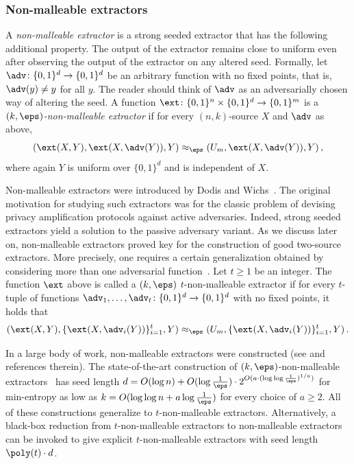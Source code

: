 \documentclass{toc}
\begin{document}
%
%
\subsubsection{Non-malleable extractors}
%
A \emph{non-malleable extractor} is a strong seeded extractor that has the following additional property. The output of the extractor remains close to uniform even after observing the output of the extractor on any altered seed. Formally, let $\adv \colon \{0,1\}^d \to \{0,1\}^d$ be an arbitrary function with no fixed points, that is, $\adv(y) \neq y$ for all $y$. The reader should think of $\adv$ as an adversarially chosen way of altering the seed. A function $\ext \colon \{0,1\}^n \times \{0,1\}^d \to \{0,1\}^m$ is a \emph{$(k,\eps)$-non-malleable extractor} if for every $(n,k)$-source $X$ and $\adv$ as above,
\begin{equation}\label{eq:nmext}
(\ext(X,Y),\ext(X,\adv(Y)),Y) \approx_\eps (U_m, \ext(X,\adv(Y)),Y)\,,
\end{equation}
where again $Y$ is uniform over $\{0,1\}^d$ and is independent of $X$. %



Non-malleable extractors were introduced by Dodis and Wichs~\cite{DW09}. The original motivation for studying such extractors %
was  %
for the classic problem of devising privacy amplification protocols against active adversaries. Indeed, strong seeded extractors yield a solution to the passive adversary variant. As we discuss later on, non-malleable extractors proved key for the construction of good two-source extractors. More precisely, one requires a certain generalization obtained by considering more than one adversarial function~\cite{CRS12}. Let $t \ge 1$ be an integer. The function $\ext$ above is called a $(k,\eps)$ $t$-non-malleable extractor if for every $t$-tuple of functions $\adv_1,\ldots,\adv_t \colon \{0,1\}^d \to \{0,1\}^d$ with no fixed points, it holds that
\[
(\ext(X,Y),\{\ext(X,\adv_i(Y))\}_{i=1}^{t},Y) \approx_\eps (U_m, \{\ext(X,\adv_i(Y))\}_{i=1}^{t},Y)\,.
\]

In a %
large body of work,
non-malleable extractors were constructed (see \cite{DLWTZ11,CRS12,Li15,Cohen16b,CGL16,Cohen16d,CS16,CL16,Cohen16c,Li17} and references therein). The state-of-the-art construction of $(k,\eps)$-non-malleable extractors~\cite{Li19} has seed length $d = O(\log{n})+ O(\log\frac1{\eps}) \cdot 2^{O(a \cdot (\log\log\frac1{\eps})^{1/a})}$ for min-entropy as low as $k = O(\log\log{n} + a \log\frac1{\eps})$ for every choice of $a \ge 2$. All of these constructions generalize to $t$-non-malleable extractors. Alternatively, a black-box reduction from $t$-non-malleable extractors to non-malleable extractors~\cite{Cohen16d} can be invoked to give explicit $t$-non-malleable extractors with seed length $\poly(t) \cdot d$.
\end{document}
